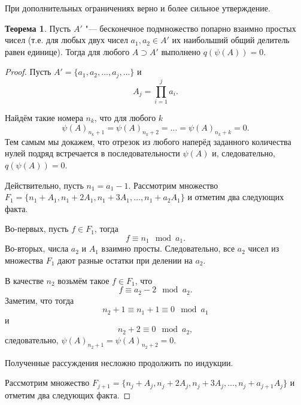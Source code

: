 \documentclass[a4paper,openbib]{article}
\theoremstyle{definition}
\newtheorem{theorem}[lemma]{Теорема}
\begin{document}
При дополнительных ограничениях верно и более сильное утверждение.

\begin{theorem}
	\label{lem:ac0_primes_infinity_mutually_prime_subset}
	Пусть $A'$ "--- бесконечное подмножество попарно взаимно простых чисел
	(т.е. для любых двух чисел $a_1, a_2 \in A'$ их наибольший общий делитель равен единице).
	Тогда для любого $A \supset A' $ выполнено $q(\psi(A))=0$.
\end{theorem}
\begin{proof}
	Пусть $A' = \{ a_1, a_2, ..., a_j, ... \}$ и
	\begin{equation}
		\label{eq:ac0_primes_A_j_prod_des}
		A_j = \prod_{i=1}^j a_i
		.
	\end{equation}

	Найдём такие номера $n_k$, что для любого $k$
	\begin{equation}
		\psi(A)_{n_k+1} = \psi(A)_{n_k+2} = \dots = \psi(A)_{n_k+k} = 0
		.
	\end{equation}
	Тем самым мы докажем, что отрезок из любого наперёд заданного количества нулей подряд
	встречается в последовательности $\psi(A)$ и, следовательно, $q(\psi(A)) = 0$.

	Действительно,
	пусть $n_1 = a_1 - 1$.
	Рассмотрим множество  $F_1 = \{ n_1 + A_1, n_1 + 2A_1, n_1 + 3A_1, \dots, n_1 + a_2A_1 \}$
	и отметим два следующих факта.

	Во-первых, пусть $f \in F_1$,
	тогда
	\begin{equation}
		f \equiv n_1 \mod a_1
		.
	\end{equation}
	Во-вторых, числа $a_2$ и $A_1$ взаимно просты.
	Следовательно, все $a_2$ чисел из множества $F_1$ дают разные остатки при делении на $a_2$.

	В качестве $n_2$ возьмём такое $f\in F_1$, что
	\begin{equation}
		f \equiv a_2 - 2 \mod a_2
		.
	\end{equation}
	Заметим, что тогда
	\begin{equation}
		n_2 + 1 \equiv n_1 + 1 \equiv 0 \mod a_1
	\end{equation}
	и
	\begin{equation}
		n_2 + 2 \equiv 0 \mod a_2
		,
	\end{equation}
	следовательно,
	$\psi(A)_{n_2 + 1} = \psi(A)_{n_2 + 2} = 0$.

	Полученные рассуждения несложно продолжить по индукции.

	Рассмотрим множество  $F_{j+1} = \{ n_j + A_j, n_j + 2A_j, n_j + 3A_j, \dots, n_j + a_{j+1}A_j \}$
	и отметим два следующих факта.


\end{proof}
\end{document}
